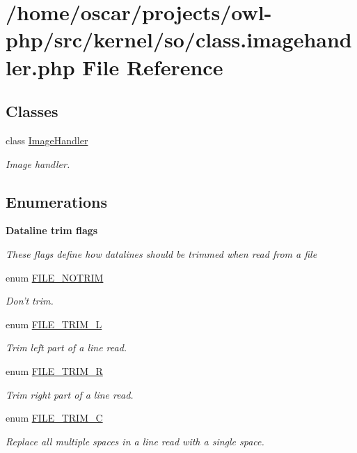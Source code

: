 \section{/home/oscar/projects/owl-\/php/src/kernel/so/class.imagehandler.php File Reference}
\label{class_8imagehandler_8php}
\subsection*{Classes}
\begin{DoxyCompactItemize}
\item 
class \hyperlink{classImageHandler}{ImageHandler}
\begin{DoxyCompactList}\small\item\em Image handler. \item\end{DoxyCompactList}\end{DoxyCompactItemize}
\subsection*{Enumerations}
\begin{Indent}{\bf Dataline trim flags}\par
{\em \label{_amgrp09e264f44360b2d7954f16ee5d28e654}
 These flags define how datalines should be trimmed when read from a file }\begin{DoxyCompactItemize}
\item 
enum \hyperlink{class_8imagehandler_8php_a3720f2e15eb9e16e29d8ecbb96763662}{FILE\_\-NOTRIM} 
\begin{DoxyCompactList}\small\item\em Don't trim. \item\end{DoxyCompactList}\item 
enum \hyperlink{class_8imagehandler_8php_a080de95fd7cf2e8d8ac78ac7ad9471ee}{FILE\_\-TRIM\_\-L} 
\begin{DoxyCompactList}\small\item\em Trim left part of a line read. \item\end{DoxyCompactList}\item 
enum \hyperlink{class_8imagehandler_8php_a7ee25ec88036b90f5a0ae8be7bc41769}{FILE\_\-TRIM\_\-R} 
\begin{DoxyCompactList}\small\item\em Trim right part of a line read. \item\end{DoxyCompactList}\item 
enum \hyperlink{class_8imagehandler_8php_a2787c3a1ecef8697c863800d0b2848a4}{FILE\_\-TRIM\_\-C} 
\begin{DoxyCompactList}\small\item\em Replace all multiple spaces in a line read with a single space. \item\end{DoxyCompactList}\end{DoxyCompactItemize}
\end{Indent}


